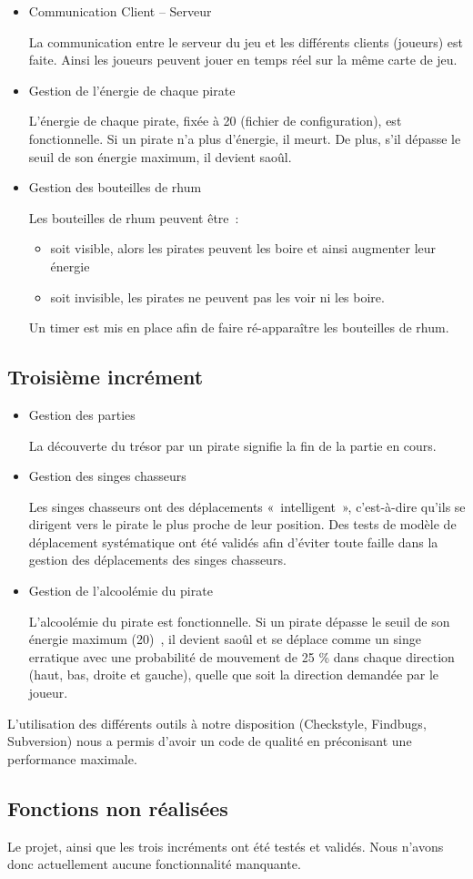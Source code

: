 \begin{itemize}
	\item Communication Client – Serveur

	La communication entre le serveur du jeu et les différents clients (joueurs) est faite. Ainsi les joueurs peuvent jouer en temps réel sur la même carte de jeu.

	\item Gestion de l’énergie de chaque pirate

	L’énergie de chaque pirate, fixée à 20 (fichier de configuration), est fonctionnelle. Si un pirate n’a plus d’énergie, il meurt. De plus, s’il dépasse le seuil de son énergie maximum, il devient saoûl.

	\item Gestion des bouteilles de rhum

	Les bouteilles de rhum peuvent être :
	\begin{itemize}
		\item soit visible, alors les pirates peuvent les boire et ainsi augmenter leur énergie
		\item soit invisible, les pirates ne peuvent pas les voir ni les boire.
	\end{itemize}

	Un timer est mis en place afin de faire ré-apparaître les bouteilles de rhum.
\end{itemize}

\subsection{Troisième incrément}
\label{subsec:inc3}

\begin{itemize}
	\item Gestion des parties

	La découverte du trésor par un pirate signifie la fin de la partie en cours.

	\item Gestion des singes chasseurs

	Les singes chasseurs ont des déplacements « intelligent », c’est-à-dire qu’ils se dirigent vers le pirate le plus proche de leur position. Des tests de modèle de déplacement systématique ont été validés afin d’éviter toute faille dans la gestion des déplacements des singes chasseurs.

	\item Gestion de l’alcoolémie du pirate

	L’alcoolémie du pirate est fonctionnelle. Si un pirate dépasse le seuil de son énergie maximum (20) , il devient saoûl et se déplace comme un singe erratique avec une probabilité de mouvement de 25 \% dans chaque direction (haut, bas, droite et gauche), quelle que soit la direction demandée par le joueur.
\end{itemize}
L’utilisation des différents outils à notre disposition (Checkstyle, Findbugs, Subversion) nous a permis d’avoir un code de qualité en préconisant une performance maximale.

\subsection{Fonctions non réalisées}
\label{subsec:irrealise}
Le projet, ainsi que les trois incréments ont été testés et validés. Nous n'avons donc actuellement aucune fonctionnalité manquante.